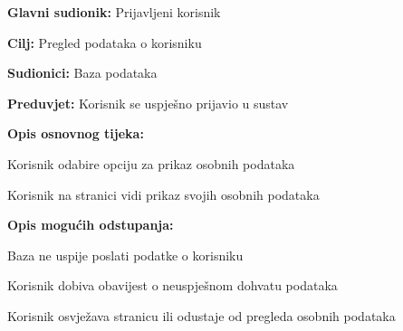 					\noindent {}
					\begin{packed_item}
	
						\item \textbf{Glavni sudionik: }Prijavljeni korisnik
						\item  \textbf{Cilj:} Pregled podataka o korisniku
						\item  \textbf{Sudionici:} Baza podataka
						\item  \textbf{Preduvjet:} Korisnik se uspješno prijavio u sustav
						\item  \textbf{Opis osnovnog tijeka:}
						
						\item[] \begin{packed_enum}
							\item Korisnik odabire opciju za prikaz osobnih podataka
							\item Korisnik na stranici vidi prikaz svojih osobnih podataka
						\end{packed_enum}

						\item  \textbf{Opis mogućih odstupanja:}

						\item[] \begin{packed_item}
							\item[2.a] Baza ne uspije poslati podatke o korisniku
							\item[] \begin{packed_enum}
								
								\item Korisnik dobiva obavijest o neuspješnom dohvatu podataka
								\item Korisnik osvježava stranicu ili odustaje od pregleda osobnih podataka
							
							\end{packed_enum}	
						\end{packed_item}
						
					\end{packed_item}

